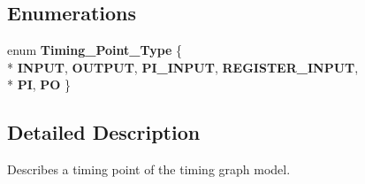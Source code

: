 \subsection*{Enumerations}
\begin{DoxyCompactItemize}
\item 
enum {\bfseries Timing\-\_\-\-Point\-\_\-\-Type} \{ \\*
{\bfseries I\-N\-P\-U\-T}, 
{\bfseries O\-U\-T\-P\-U\-T}, 
{\bfseries P\-I\-\_\-\-I\-N\-P\-U\-T}, 
{\bfseries R\-E\-G\-I\-S\-T\-E\-R\-\_\-\-I\-N\-P\-U\-T}, 
\\*
{\bfseries P\-I}, 
{\bfseries P\-O}
 \}
\end{DoxyCompactItemize}


\subsection{Detailed Description}
Describes a timing point of the timing graph model. 
